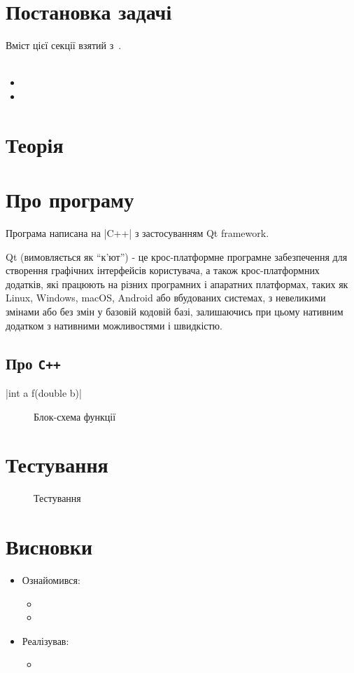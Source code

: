 \documentclass[../../../../document]{subfiles}
\begin{document}
	\chapter{Постановка задачі}
	Вміст цієї секції взятий з~\cite{computational_methods}.\\
	\\
	\begin{itemize}
		\item
		\item
	\end{itemize}

	\chapter{Теорія}
	\chapter{Про програму}
	Програма написана на \textinline|C++| з застосуванням Qt framework.

	Qt (вимовляється як \enquote{к'ют}) - це крос-платформне
	програмне забезпечення для створення графічних інтерфейсів користувача, а також
	крос-платформних додатків, які працюють на різних програмних і апаратних
	платформах, таких як Linux, Windows, macOS, Android або вбудованих системах, з
	невеликими змінами або без змін у базовій кодовій базі, залишаючись при цьому
	нативним додатком з нативними можливостями і швидкістю.
	\section{Про \texttt{C++}}
	\begin{funcDescription}
		|int a f(double b)|
		
	\end{funcDescription}
	


	\begin{figure}[htb]
		\centering
		\caption{Блок-схема функції }%
		\label{fig:blockdiagram}%
	\end{figure}

	\chapter{Тестування}
	\begin{figure}[htb]
		\centering
		\caption{Тестування}%
		\label{fig:tag}
	\end{figure}

	\chapter{Висновки}
	\begin{itemize}
		\item Ознайомився:
			\begin{itemize}
				\item
				\item
			\end{itemize}
		\item Реалізував:
			\begin{itemize}
				\item
			\end{itemize}
	\end{itemize}
\end{document}
